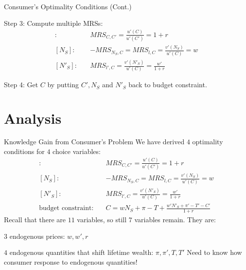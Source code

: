 \documentclass[11pt,aspectratio=169,usenames,dvipsnames]{beamer}
\let\tempone\itemize
\let\temptwo\enditemize
\renewenvironment{itemize}{\tempone\addtolength{\itemsep}{\fill}}{\temptwo}
\begin{document}
\begin{frame}{Consumer's Optimality Conditions (Cont.)}
\label{slide:Consumer_s_Optimality_Conditions__Cont__}
    \begin{itemize}
        \item Step 3: Compute multiple MRSs:
        \begin{align*}
            [C']: \quad
                & MRS_{C, C'} = \frac{u'( C )}{u'( C' )} = 1+r
            \\
            [ N_{S} ]: \quad
                & -MRS_{N_{S}, C} = MRS_{l, C} = \frac{v'( N_{S} )}{u'( C )} = w
            \\
            [ N'_{S} ]: \quad
                & MRS_{l', C} = \frac{v'( N'_{S} )}{u'( C )} = \frac{w'}{1+r}
        \end{align*}
        \item Step 4: Get $ C $ by putting $ C', N_{S} $ and $ N'_{S} $ back to budget constraint.
    \end{itemize}
\end{frame}

\section{Analysis}
\label{sec:Analysis}

\begin{frame}{Knowledge Gain from Consumer's Problem}
\label{slide:Knowledge_Gain_from_Consumer_s_Problem}
    We have derived $ 4 $ optimality conditions for $ 4 $ choice variables:
        \begin{align*}
            [C']: \quad
                & MRS_{C, C'} = \frac{u'( C )}{u'( C' )} = 1+r
            \\
            [ N_{S} ]: \quad
                & -MRS_{N_{S}, C} = MRS_{l, C} = \frac{v'( N_{S} )}{u'( C )} = w
            \\
            [ N'_{S} ]: \quad
                & MRS_{l', C} = \frac{v'( N'_{S} )}{u'( C )} = \frac{w'}{1+r}
            \\
            \text{budget constraint}: \quad
                & C = w N_{S} + \pi - T + \frac{w' N'_{S} + \pi' - T' - C'}{1+r}
        \end{align*}
    Recall that there are $ 11 $ variables, so still $ 7 $ variables remain. They are:
    \begin{itemize}
        \item $ 3 $ endogenous prices: $ w, w', r $
        \item $ 4 $ endogenous quantities that shift lifetime wealth: $ \pi, \pi', T, T' $
    \end{itemize}
    \alert{Need to know how consumer response to endogenous quantities!}
\end{frame}
\end{document}
